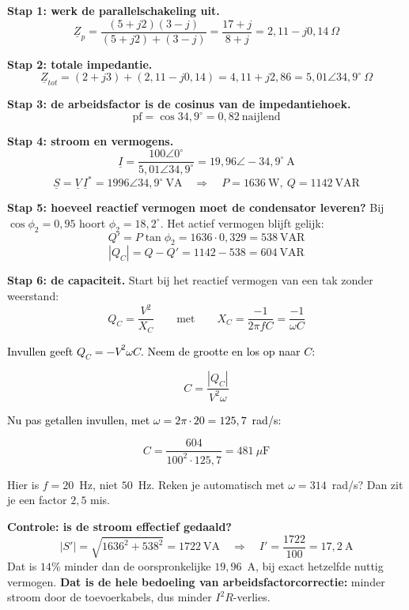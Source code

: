 \documentclass[a4paper,11pt]{article}
\newcommand{\stapreden}[1]{\par\vspace{1.4mm}\noindent\textcolor{black}{#1}\par\vspace{-2mm}}
\begin{document}
\begin{oefenblok}[Arbeidsfactorcorrectie]

    \textbf{Stap 1: werk de parallelschakeling uit.}
    \[\underline{Z}_p = \frac{(5+j2)(3-j)}{(5+j2)+(3-j)} = \frac{17+j}{8+j} = 2{,}11 - j0{,}14\ \Omega\]

    \textbf{Stap 2: totale impedantie.}
    \[\underline{Z}_{tot} = (2+j3) + (2{,}11 - j0{,}14) = 4{,}11 + j2{,}86 = 5{,}01\angle 34{,}9^\circ\ \Omega\]

    \textbf{Stap 3: de arbeidsfactor is de cosinus van de impedantiehoek.}
    \[\text{pf} = \cos 34{,}9^\circ = \boxed{0{,}82\ \text{naijlend}}\]

    \textbf{Stap 4: stroom en vermogens.}
    \[\underline{I} = \frac{100\angle 0^\circ}{5{,}01\angle 34{,}9^\circ} = 19{,}96\angle -34{,}9^\circ\ \text{A}\]
    \[\underline{S} = \underline{V}\,\underline{I}^{*} = 1996\angle 34{,}9^\circ\ \text{VA}
        \quad\Rightarrow\quad P = 1636\ \text{W},\ Q = 1142\ \text{VAR}\]

    \textbf{Stap 5: hoeveel reactief vermogen moet de condensator leveren?}
    Bij $\cos\phi_2 = 0{,}95$ hoort $\phi_2 = 18{,}2^\circ$. Het actief vermogen blijft gelijk:
    \[Q' = P\tan\phi_2 = 1636 \cdot 0{,}329 = 538\ \text{VAR}\]
    \[|Q_C| = Q - Q' = 1142 - 538 = 604\ \text{VAR}\]

    \textbf{Stap 6: de capaciteit.} Start bij het reactief vermogen van een tak zonder weerstand:
    \[Q_C = \frac{V^2}{X_C} \qquad\text{met}\qquad X_C = \frac{-1}{2\pi f C} = \frac{-1}{\omega C}\]

    \stapreden{Invullen geeft $Q_C = -V^2\omega C$. Neem de grootte en los op naar $C$:}
    \[C = \frac{|Q_C|}{V^2\omega}\]

    \stapreden{Nu pas getallen invullen, met $\omega = 2\pi \cdot 20 = 125{,}7$~rad/s:}
    \[C = \frac{604}{100^2 \cdot 125{,}7} = \boxed{481\ \mu\text{F}}\]

    \begin{waarschuwing}
        Hier is $f = 20$~Hz, niet $50$~Hz. Reken je automatisch met $\omega = 314$~rad/s? Dan zit je
        een factor $2{,}5$ mis.
    \end{waarschuwing}

    \textbf{Controle: is de stroom effectief gedaald?}
    \[|S'| = \sqrt{1636^2 + 538^2} = 1722\ \text{VA} \quad\Rightarrow\quad I' = \frac{1722}{100} = 17{,}2\ \text{A}\]
    Dat is $14\%$ minder dan de oorspronkelijke $19{,}96$~A, bij exact hetzelfde nuttig vermogen.
    \textbf{Dat is de hele bedoeling van arbeidsfactorcorrectie:} minder stroom door de
    toevoerkabels, dus minder $I^2R$-verlies.
\end{oefenblok}
\end{document}
